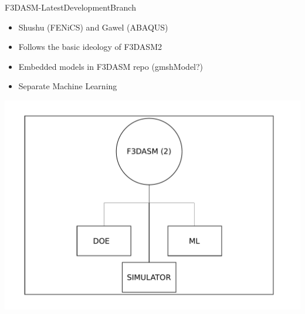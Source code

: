 \documentclass[aspectratio=169]{beamer}
\begin{document}
\begin{frame}{F3DASM-LatestDevelopmentBranch}
  \begin{minipage}{0.5\textwidth}
  \begin{itemize}
    \item Shushu (FENiCS) and Gawel (ABAQUS)
    \item Follows the basic ideology of F3DASM2
    \item Embedded models in F3DASM repo (gmshModel?)
    \item Separate Machine Learning 
  \end{itemize}
  \end{minipage}%
  \begin{minipage}{0.5\textwidth}
    \includegraphics[width=\textwidth]{Figures/F3DASM2.pdf}
  \end{minipage}
\end{frame}
\end{document}
